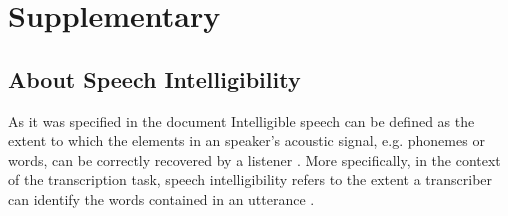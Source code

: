 \section{Supplementary}

\subsection{About Speech Intelligibility}
%
As it was specified in the document Intelligible speech can be defined as the extent to which the elements in an speaker's acoustic signal, e.g. phonemes or words, can be correctly recovered by a listener \citep{Kent_et_al_1989, Whitehill_et_al_2004, vanHeuven_2008, Freeman_et_al_2017}. More specifically, in the context of the transcription task, speech intelligibility refers to the extent a transcriber can identify the words contained in an utterance \cite{Boonen_et_al_2021}.

\begin{comment}
is interpreted here as a latent trait of individuals which underlies the probability of answering the questions in the sample correctly. Henceforth, statements such ‘knowledge is influenced by’ can be read as ‘the probability of correctly answering the questions in the sample is influenced by’. Despite this practical approach, we did our best to improve the construct validity of our study, by both developing the questionnaire and managing the resulting data in collaboration with informants sharing language and culture with the interviewees. We then expect knowledge, as measured by our model, to reflect the general ecological knowledge possessed by individuals, but do not deal with general epistemological considerations on the connection between the two.
\end{comment}
%
%
